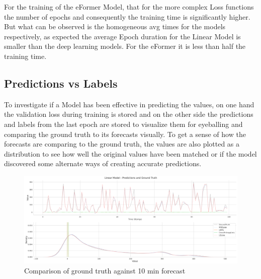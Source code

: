 \documentclass{article}
\begin{document}
For the training of the eFormer Model, that for the more complex Loss functions the number of epochs and consequently the training time is significantly higher. But what can be observed is the homogeneous avg times for the models respectively, as expected the average Epoch duration for the Linear Model is smaller than the deep learning models. For the eFormer it is less than half the training time. 

\subsection{Predictions vs Labels}

To investigate if a Model has been effective in predicting the values, on one hand the validation loss during training is stored and on the other side the predictions and labels from the last epoch are stored to visualize them for eyeballing and comparing the ground truth to its forecasts visually. To get a sense of how the forecasts are comparing to the ground truth, the values are also plotted as a distribution to see how well the original values have been matched or if the model discovered some alternate ways of creating accurate predictions. 

\begin{figure}
    \centering
    \includegraphics[width=\linewidth]{graphs/results/Linear_model_analysis.png}
    \caption{Comparison of ground truth against 10 min forecast}
    \label{fig:Linear_f1}
\end{figure}
\end{document}
